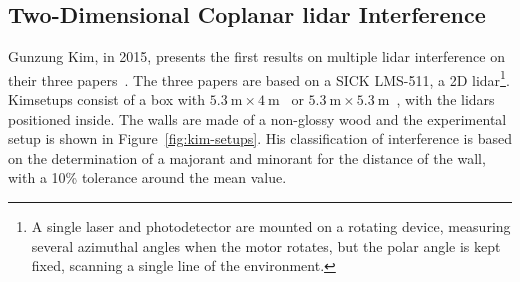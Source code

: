 \subsection{Two-Dimensional Coplanar \acs{lidar} Interference}
Gunzung Kim\etal, in 2015, presents the first results on multiple \ac{lidar} interference on their three papers~\cite{Kim2015a, Kim2015b, Kim2015c}. The three papers are based on a SICK LMS-511, a 2D \ac{lidar}\footnote{A single \ac{laser} and photodetector are mounted on a rotating device, measuring several azimuthal angles when the motor rotates, but the polar angle is kept fixed, scanning a single line of the environment.}. Kim\etal setups consist of a box with $\SI{5.3}{\meter} \times \SI{4}{\meter}$~\cite{Kim2015a} or $\SI{5.3}{\meter} \times \SI{5.3}{\meter}$~\cite{Kim2015b, Kim2015c}, with the \acp{lidar} positioned inside. The walls are made of a non-glossy wood and the experimental setup is shown in Figure~\ref{fig:kim-setups}. His classification of interference is based on the determination of a majorant and minorant for the distance of the wall, with a 10\% tolerance around the mean value.

